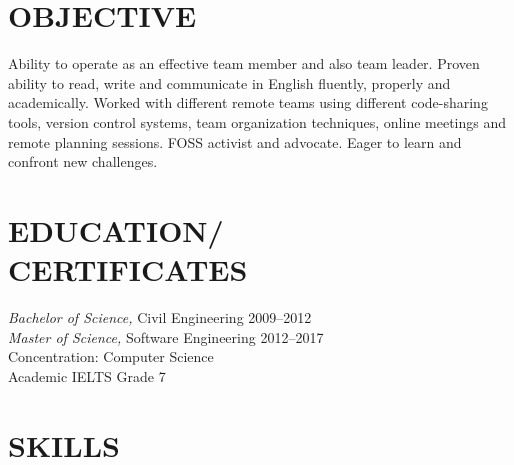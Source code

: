 \documentclass[margin, 10pt]{res} %
\begin{document}
\begin{resume}


\section{OBJECTIVE}
Ability to operate as an effective team member and also team leader.
Proven ability to read, write and communicate in English fluently, properly and academically.
Worked with different remote teams  using different code-sharing tools,
version control systems, team organization techniques, online meetings and remote
planning sessions.
FOSS activist and advocate. Eager to learn and confront new challenges.

\section{EDUCATION/ \\CERTIFICATES}

{\sl Bachelor of Science,} Civil Engineering 2009--2012 \\
{\sl Master of Science,} Software Engineering 2012--2017 \\
Concentration: Computer Science \\
Academic IELTS Grade 7

\section{SKILLS}


\end{resume}
\end{document}

